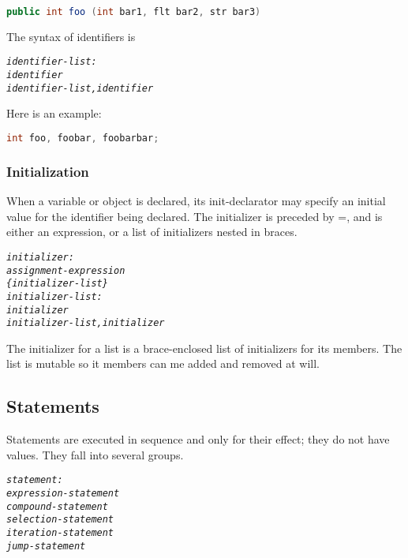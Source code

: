\documentclass[12pt]{report}
\begin{document}
\begin{doublespace}
\begin{singlespace}
\begin{lstlisting}[language=Java,label=some-code,caption=foo declaration]
public int foo (int bar1, flt bar2, str bar3)
\end{lstlisting}
\end{singlespace}
The syntax of identifiers is
\begin{singlespace}
\begin{alltt}
         \textit{identifier-list:}
              \textit{identifier}
              \textit{identifier-list , identifier}
\end{alltt}
\end{singlespace}
Here is an example:
\begin{singlespace}
\begin{lstlisting}[language=Java,label=some-code,caption=foo declaration]
int foo, foobar, foobarbar;
\end{lstlisting}
\end{singlespace}
\end{doublespace}

\subsubsection{Initialization}
\begin{doublespace}
When a variable or object is declared, its init-declarator may specify an initial value for the identifier being declared. The initializer is preceded by =, and is either an expression, or a list of initializers nested in braces.
\begin{singlespace}
\begin{alltt}
         \textit{initializer:}
              \textit{assignment-expression}
              \textit{\{ initializer-list \}}
         \textit{initializer-list:}
              \textit{initializer}
              \textit{initializer-list , initializer}
\end{alltt}
\end{singlespace}
The initializer for a list is a brace-enclosed list of initializers for its members. The list is mutable so it members can me added and removed at will.
\end{doublespace}

\subsection{Statements}
\begin{doublespace}
Statements are executed in sequence and only for their effect; they do not have values. They fall into several groups.
\begin{singlespace}
\begin{alltt}
         \textit{statement:}
              \textit{expression-statement}
              \textit{compound-statement}
              \textit{selection-statement}
              \textit{iteration-statement}
              \textit{jump-statement}
\end{alltt}
\end{singlespace}
\end{doublespace}
\end{document}
